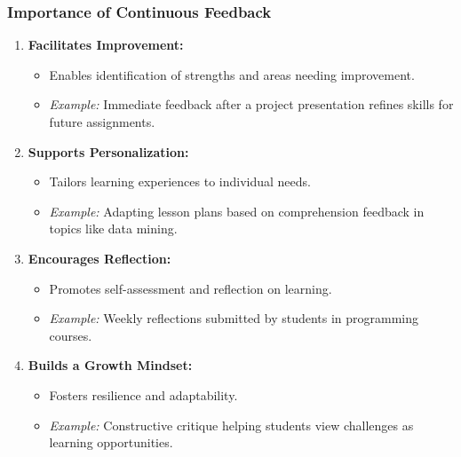 \documentclass[aspectratio=169]{beamer}
\begin{document}
\begin{frame}[fragile]
    \frametitle{Importance of Continuous Feedback}
    \begin{enumerate}
        \item \textbf{Facilitates Improvement:}
        \begin{itemize}
            \item Enables identification of strengths and areas needing improvement.
            \item \textit{Example:} Immediate feedback after a project presentation refines skills for future assignments.
        \end{itemize}

        \item \textbf{Supports Personalization:}
        \begin{itemize}
            \item Tailors learning experiences to individual needs.
            \item \textit{Example:} Adapting lesson plans based on comprehension feedback in topics like data mining.
        \end{itemize}

        \item \textbf{Encourages Reflection:}
        \begin{itemize}
            \item Promotes self-assessment and reflection on learning.
            \item \textit{Example:} Weekly reflections submitted by students in programming courses.
        \end{itemize}

        \item \textbf{Builds a Growth Mindset:}
        \begin{itemize}
            \item Fosters resilience and adaptability.
            \item \textit{Example:} Constructive critique helping students view challenges as learning opportunities.
        \end{itemize}
    \end{enumerate}
\end{frame}
\end{document}
